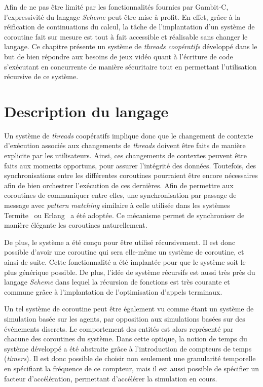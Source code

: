 \documentclass[12pt,twoside,letterpaper,francais]{book}
\newcommand{\Schemelang}{{\textit{Scheme }}}
\begin{document}
Afin de ne pas être limité par les fonctionnalités fournies par
Gambit-C, l'expressivité du langage \Schemelang peut être mise à profit. En
effet, grâce à la réification de continuations du calcul, la tâche de
l'implantation d'un système de coroutine fait sur mesure est tout à
fait accessible et réalisable sans changer le langage. Ce chapitre
présente un système de \textit{threads} \emph{coopératifs} développé
dans le but de bien répondre aux besoins de jeux vidéo quant à
l'écriture de code s'exécutant en concurrente de manière sécuritaire
tout en permettant l'utilisation récursive de ce système.


\FloatBarrier
\section{Description du langage}
Un système de \textit{threads} coopératifs implique donc que le
changement de contexte d'exécution associés aux changements de
\textit{threads} doivent être faits de manière explicite par les
utilisateurs. Ainsi, ces changements de contextes peuvent être faits
aux moments opportuns, pour assurer l'intégrité des
données. Toutefois, des synchronisations entre les différentes
coroutines pourraient être encore nécessaires afin de bien orchestrer
l'exécution de ces dernières. Afin de permettre aux coroutines de
communiquer entre elles, une synchronisation par passage de message
avec \textit{pattern matching} similaire à celle utilisée dans les
systèmes Termite~\cite{Termite_paper} ou Erlang~\cite{Erlang} a été
adoptée. Ce mécanisme permet de synchroniser de manière élégante les
coroutines naturellement.

De plus, le système a été conçu pour être utilisé récursivement. Il
est donc possible d'avoir une coroutine qui sera elle-même un système
de coroutine, et ainsi de suite. Cette fonctionnalité a été implantée
pour que le système soit le plus générique possible. De plus, l'idée
de système récursifs est aussi très près du langage \Schemelang dans lequel
la récursion de fonctions est très courante et commune grâce à
l'implantation de l'optimisation d'appels terminaux.

Un tel système de coroutine peut être également vu comme étant un
système de simulation basée sur les agents, par opposition aux
simulations basées sur des événements discrets. Le comportement des
entités est alors représenté par chacune des coroutines du
système. Dans cette optique, la notion de temps du système développé a
été abstraite grâce à l'introduction de compteurs de temps
(\textit{timers}). Il est donc possible de choisir non seulement une
granularité temporelle en spécifiant la fréquence de ce compteur, mais
il est aussi possible de spécifier un facteur d'accélération,
permettant d'accélérer la simulation en cours.
\end{document}
